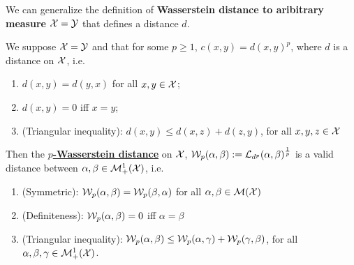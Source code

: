 \documentclass[11pt]{article}
\begin{document}
We can generalize the definition of \textbf{Wasserstein distance to aribitrary measure} ${\mathcal X} = {\mathcal Y}$ that defines a distance $d$. 
\begin{proposition}
We suppose ${\mathcal X} = {\mathcal Y}$ and that for some $p \ge 1$, $c(x,y)= d(x,y)^p$, where $d$ is a distance on ${\mathcal X}$, i.e. 
\begin{enumerate}
\item $d(x, y) = d(y, x)$ for all $x, y\in {\mathcal X}$; 
\item $d(x, y)  = 0$ iff  $x=y$;
\item (Triangular inequality): \; $d(x, y) \le d(x, z) + d(z, y)$, for all $x, y, z \in {\mathcal X}$
\end{enumerate}
Then the \underline{\textbf{$p$-Wasserstein distance}} on ${\mathcal X}$, ${\mathcal W}_{p}(\alpha, \beta) := {\mathcal L}_{d^{p}}(\alpha, \beta)^{\frac{1}{p}}$ is a valid distance between $\alpha, \beta \in {\mathcal M}_{+}^{1}({\mathcal X})$, i.e. 
\begin{enumerate}
\item (Symmetric):\; ${\mathcal W}_{p}(\alpha, \beta) = {\mathcal W}_{p}( \beta, \alpha)$ for all $\alpha, \beta \in  {\mathcal M}({\mathcal X})$
\item (Definiteness):\; ${\mathcal W}_{p}(\alpha, \beta) = 0 $ iff $\alpha = \beta$
\item (Triangular inequality): \; ${\mathcal W}_{p}(\alpha, \beta)  \le {\mathcal W}_{p}(\alpha, \gamma)  + {\mathcal W}_{p}(\gamma, \beta) $, for all $\alpha, \beta, \gamma \in {\mathcal M}_{+}^{1}({\mathcal X})$.
\end{enumerate}
\end{proposition}
\end{document}
